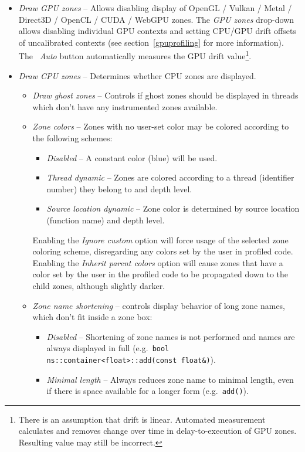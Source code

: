 \documentclass[hidelinks,titlepage,a4paper,twoside]{article}
\begin{document}
\begin{itemize}
\item \emph{\faEye{} Draw GPU zones} -- Allows disabling display of OpenGL / Vulkan / Metal / Direct3D / OpenCL / CUDA / WebGPU zones. The \emph{GPU zones} drop-down allows disabling individual GPU contexts and setting CPU/GPU drift offsets of uncalibrated contexts (see section~\ref{gpuprofiling} for more information). The \emph{\faRobot~Auto} button automatically measures the GPU drift value\footnote{There is an assumption that drift is linear. Automated measurement calculates and removes change over time in delay-to-execution of GPU zones. Resulting value may still be incorrect.}.
\item \emph{\faMicrochip{} Draw CPU zones} -- Determines whether CPU zones are displayed.
\begin{itemize}
\item \emph{\faGhost{} Draw ghost zones} -- Controls if ghost zones should be displayed in threads which don't have any instrumented zones available.
\item \emph{\faPalette{} Zone colors} -- Zones with no user-set color may be colored according to the following schemes:
\begin{itemize}
\item \emph{Disabled} -- A constant color (blue) will be used.
\item \emph{Thread dynamic} -- Zones are colored according to a thread (identifier number) they belong to and depth level.
\item \emph{Source location dynamic} -- Zone color is determined by source location (function name) and depth level.
\end{itemize}
Enabling the \emph{Ignore custom} option will force usage of the selected zone coloring scheme, disregarding any colors set by the user in profiled code.
Enabling the \emph{Inherit parent colors} option will cause zones that have a color set by the user in the profiled code to be propagated down to the child zones, although slightly darker.
\item \emph{\faRulerHorizontal{} Zone name shortening} -- controls display behavior of long zone names, which don't fit inside a zone box:
\begin{itemize}
\item \emph{Disabled} -- Shortening of zone names is not performed and names are always displayed in full (e.g.\ \texttt{bool ns::container<float>::add(const float\&)}).
\item \emph{Minimal length} -- Always reduces zone name to minimal length, even if there is space available for a longer form (e.g.\ \texttt{add()}).

\end{itemize}
\end{itemize}
\end{itemize}
\end{document}
